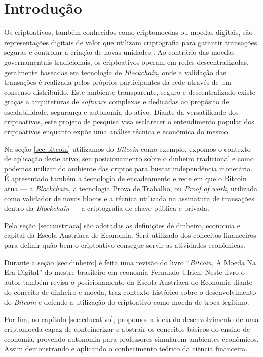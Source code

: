 
\chapter{Introdução}

Os criptoativos, também conhecidos como criptomoedas ou moedas digitais, são representações digitais de valor que utilizam criptografia para garantir transações seguras e controlar a criação de novas unidades \cite{Yetmar2023}. Ao contrário das moedas governamentais tradicionais, os criptoativos operam em redes descentralizadas, geralmente baseadas em tecnologia de \textit{Blockchain}, onde a validação das transações é realizada pelos próprios participantes da rede através de um consenso distribuído. Este ambiente transparente, seguro e descentralizado existe graças a arquiteturas de \textit{software} complexas e dedicadas ao propósito de escalabilidade, segurança e autonomia do ativo. Diante da versatilidade dos criptoativos, este projeto de pesquisa visa esclarecer o entendimento popular dos criptoativos enquanto expõe uma análise técnica e econômica do mesmo. 

Na seção \ref*{sec:bitcoin} utilizamos do \textit{Bitcoin} como exemplo, expomos o contexto de aplicação deste ativo, seu posicionamento sobre o dinheiro tradicional e como podemos utilizar do ambiente das criptos para buscar independência monetária. É apresentado também a tecnologia de encadeamento e rede em que o Bitcoin atua — a \textit{Blockchain}, a tecnologia Prova de Trabalho, ou \textit{Proof of work}, utilizada como validador de novos blocos e a técnica utilizada na assinatura de transações dentro da \textit{Blockchain} — a criptografia de chave pública e privada.

Pela seção \ref*{sec:austriaca} são adotadas as definições de dinheiro, economia e capital da Escola Austríaca de Economia. Será utilizado dos conceitos financeiros para definir quão bem o criptoativo consegue servir as atividades econômicas.

Durante a seção \ref*{sec:dinheiro} é feita uma revisão do livro ``\textit{Bitcoin}, A Moeda Na Era Digital'' do mestre brasileiro em economia Fernando Ulrich. Neste livro o autor também revisa o posicionamento da Escola Austríaca de Economia diante do conceito de dinheiro e moeda, traz contexto histórico sobre o desenvolvimento do \textit{Bitcoin} e defende a utilização do criptoativo como moeda de troca legítimo.


Por fim, no capítulo \ref*{sec:educativo}, propomos a ideia do desenvolvimento de uma criptomoeda capaz de conteinerizar e abstrair os conceitos básicos do ensino de economia, provendo autonomia para professores simularem ambientes econômicos. Assim demonstrando e aplicando o conhecimento teórico da ciência financeira.

